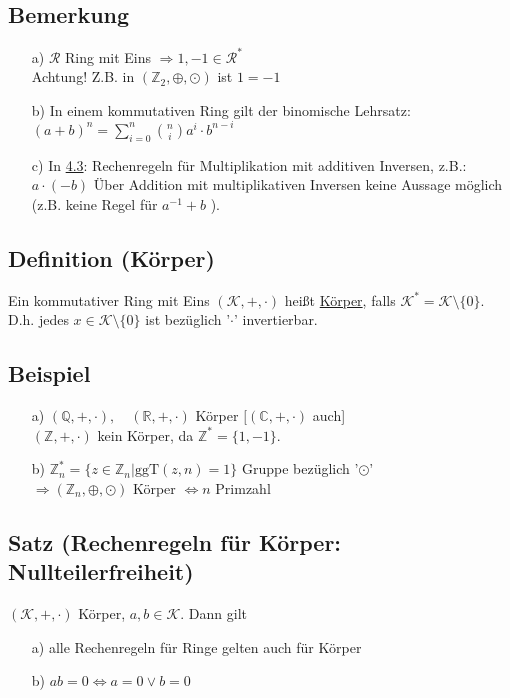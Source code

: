 \documentclass[12pt,titlepage, pdf]{article}
\newcommand{\uline}[1]{\underline{#1}}
\renewcommand{\>}{\rightarrow}
\renewcommand{\*}{\cdot}
\begin{document}
	\subsection{Bemerkung}
	\begin{itemize}
		\item[a)] $\mathcal{R}$ Ring mit Eins $\Rightarrow 1, -1 \in \mathcal{R}^*$ \\
		Achtung! Z.B. in $(\mathds{Z}_2, \oplus, \odot)$ ist $1 = -1$
		\item[b)] In einem kommutativen Ring gilt der binomische Lehrsatz:\\
		$(a+b)^n = \sum_{i = 0}^{n} {n\choose{i}} a^i \cdot b^{n-i}$
		\item[c)] In \hyperref[4.3]{4.3}: Rechenregeln für Multiplikation mit additiven Inversen, z.B.: $a\cdot(-b)$ Über Addition mit multiplikativen Inversen keine Aussage möglich (z.B. keine Regel für $a^{-1}+b$ ).
	\end{itemize}
	
	\subsection{Definition (Körper)}
	Ein kommutativer Ring mit Eins $(\mathcal{K}, +, \cdot)$ heißt \uline{Körper}, falls $\mathcal{K}^* = \mathcal{K} \setminus \{0\}$. D.h. jedes $x \in \mathcal{K} \setminus \{0\}$ ist bezüglich '$\cdot$' invertierbar.
	
	\subsection{Beispiel}
	\begin{itemize}
		\item[a)] $(\mathds{Q},+,\cdot),\quad (\mathds{R},+,\cdot)$ Körper $[(\mathds{C},+,\cdot)$ auch] \\
		$(\mathds{Z},+,\cdot)$ kein Körper, da $\mathds{Z}^* = \{1,-1\}$.
		\item[b)] $\mathds{Z}_n^* = \{z \in \mathds{Z}_n| \text{ggT}(z,n) = 1\}$ Gruppe bezüglich '$\odot$'\\
		$\Rightarrow (\mathds{Z}_n, \oplus, \odot)$ Körper $\Leftrightarrow n$ Primzahl
	\end{itemize}
	
	\subsection{Satz (Rechenregeln für Körper: Nullteilerfreiheit)}
	\label{4.7}	
	$(\mathcal{K},+,\cdot)$ Körper, $a,b \in \mathcal{K}$. Dann gilt
	\begin{itemize}
		\item[a)] alle Rechenregeln für Ringe gelten auch für Körper
		\item[b)] $ab = 0 \Leftrightarrow a = 0\vee b = 0$ \qquad [Gegenbeispiel: $(\mathds{Z}_6, \oplus, \odot)$, weil $2 \odot 3 = 0$]
	\end{itemize}
\end{document}

